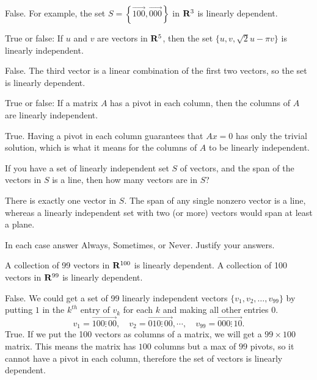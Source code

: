 \begin{problems}
\begin{solution}
False.  For example, the set $S=\left\{\vec{1 0 0}, \vec{0 0 0}\right\}$ 
in ${\bf R}^3$ is linearly dependent.   
\end{solution}

\problem %
True or false: %
If $u$ and $v$ are vectors in ${\bf R}^5$, then the set 
$\{u, v, \sqrt{2}u - \pi v\}$ is linearly independent.

\begin{solution}
False.  The third vector is a linear combination of the first two vectors, 
so the set is linearly dependent.
\end{solution}

\problem %
True or false: %
If a matrix $A$ has a pivot in each column, then the columns of $A$ are 
linearly independent.

\begin{solution}
True.  Having a pivot in each column guarantees that $Ax = 0$ has only the 
trivial solution, which is what it means for the columns of $A$ to be 
linearly independent.
\end{solution}

\problem %
If you have a set of linearly independent set $S$ of vectors, and the span of
the vectors in $S$ is a line, then how many vectors are in $S$?

\begin{solution}
  There is exactly one vector in $S$.  The span of any single nonzero vector is
  a line, whereas a linearly independent set with two (or more) vectors would
  span at least a plane.
\end{solution}
    
\problem %
In each case answer Always, Sometimes, or Never.  Justify your answers.
\begin{subproblems}
  \subproblem A collection of 99 vectors in ${\bf R}^{100}$ is linearly
  dependent. %
  \subproblem A collection of 100 vectors in ${\bf R}^{99}$ is
  linearly dependent.
\end{subproblems}

\begin{solution}
  \begin{subproblems}
    \subproblem False.  We could get a set of 99 linearly independent vectors
    $\{v_1, v_2, \ldots, v_{99}\}$ by putting $1$ in the $k^{th}$ entry of $v_k$
    for each $k$ and making all other entries $0$.
    \[v_1 = \vec{1 0 0 \vdots \, 0 0}, \quad v_2 = \vec{0 1 0 \vdots \, 0 0},
      \cdots, \quad v_{99} = \vec{0 0 0 \vdots \, 1 0}.\] \subproblem True.  If
    we put the 100 vectors as columns of a matrix, we will get a $99 \times 100$
    matrix.  This means the matrix has $100$ columns but a max of $99$ pivots,
    so it cannot have a pivot in each column, therefore the set of vectors is
    linearly dependent.
    \end{subproblems}
  \end{solution}


\end{problems}
